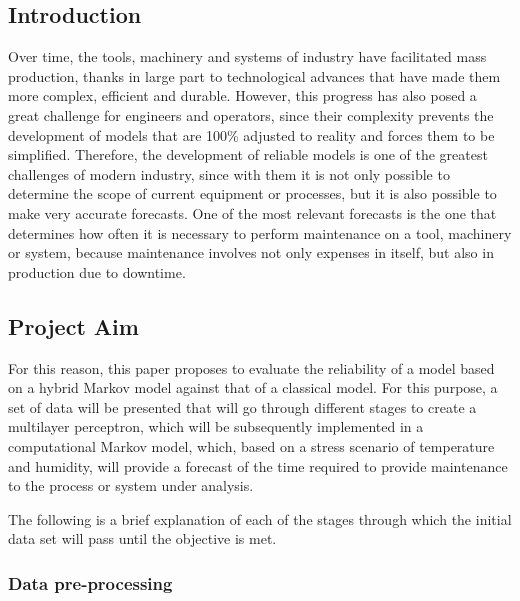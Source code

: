 \documentclass{article}
\begin{document}
\newpage 
\begin{doublespacing}
\setcounter{page}{1}

\section{Introduction}

\par Over time, the tools, machinery and systems of industry have facilitated mass production, thanks in large part to technological advances that have made them more complex, efficient and durable. However, this progress has also posed a great challenge for engineers and operators, since their complexity prevents the development of models that are 100\% adjusted to reality and forces them to be simplified. Therefore, the development of reliable models is one of the greatest challenges of modern industry, since with them it is not only possible to determine the scope of current equipment or processes, but it is also possible to make very accurate forecasts. One of the most relevant forecasts is the one that determines how often it is necessary to perform maintenance on a tool, machinery or system, because maintenance involves not only expenses in itself, but also in production due to downtime. 

\subsection{Project Aim}

\par For this reason, this paper proposes to evaluate the reliability of a model based on a hybrid Markov model against that of a classical model.  For this purpose, a set of data will be presented that will go through different stages to create a multilayer perceptron, which will be subsequently implemented in a computational Markov model, which, based on a stress scenario of temperature and humidity, will provide a forecast of the time required to provide maintenance to the process or system under analysis.

\par The following is a brief explanation of each of the stages through which the initial data set will pass until the objective is met. 

\subsubsection{Data pre-processing}


\end{doublespacing}
\end{document}
